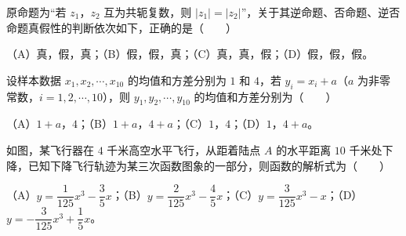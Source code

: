 \begin{question}
原命题为“若 $z_1$，$z_2$ 互为共轭复数，则 $|z_1|=|z_2|$”，关于其逆命题、否命题、逆否命题真假性的判断依次如下，正确的是\mbox{（　　）}

（A）真，假，真；（B）假，假，真；（C）真，真，假；（D）假，假，假。

\end{question}
\begin{question}
设样本数据 $x_1,x_2,\cdots,x_{10}$ 的均值和方差分别为 $1$ 和 $4$，若 $y_i=x_i+a$（$a$ 为非零常数，$i=1,2,\cdots,10$），则 $y_1,y_2,\cdots,y_{10}$ 的均值和方差分别为\mbox{（　　）}

（A）$1+a$，$4$；（B）$1+a$，$4+a$；（C）$1$，$4$；（D）$1$，$4+a$。

\Needspace{0.4\textheight}
\end{question}
\begin{question}
如图，某飞行器在 $4$ 千米高空水平飞行，从距着陆点 $A$ 的水平距离 $10$ 千米处下降，已知下降飞行轨迹为某三次函数图象的一部分，则函数的解析式为\mbox{（　　）}
\nopagebreak[4]
\begin{center}\end{center}
\nopagebreak[4]
（A）$y=\dfrac{1}{125}x^3-\dfrac35x$；（B）$y=\dfrac{2}{125}x^3-\dfrac45x$；（C）$y=\dfrac{3}{125}x^3-x$；（D）$y=-\dfrac{3}{125}x^3+\dfrac15x$。

\end{question}

